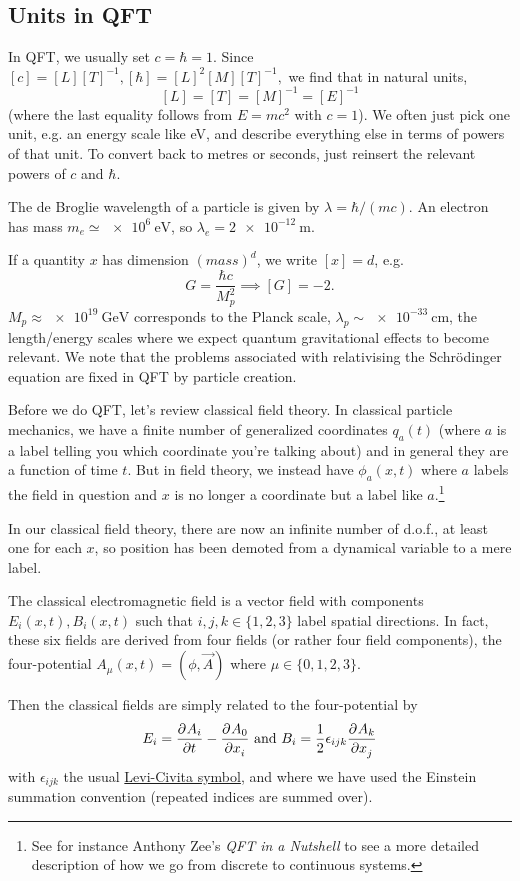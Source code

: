 \subsection*{Units in QFT} In QFT, we usually set $c=\hbar=1$. Since $[c]=[L][T]^{-1}, [\hbar]=[L]^2[M][T]^{-1},$ we find that in natural units, $$[L]=[T]=[M]^{-1}=[E]^{-1}$$ (where the last equality follows from $E=mc^2$ with $c=1$). We often just pick one unit, e.g. an energy scale like eV, and describe everything else in terms of powers of that unit. To convert back to metres or seconds, just reinsert the relevant powers of $c$ and $\hbar$.

\begin{exm}
The de Broglie wavelength of a particle is given by $\lambda=\hbar/(mc)$. An electron has mass $m_e\simeq \SI{e6}{\electronvolt}$, so $\lambda_e = \SI{2e-12}{\meter}$.
\end{exm}

If a quantity $x$ has dimension $(mass)^d$, we write $[x]=d$, e.g. $$G=\frac{\hbar c}{M_p^2}\implies [G]=-2.$$  $M_p \approx \SI{e19}{\giga\electronvolt}$ corresponds to the Planck scale, $\lambda_p \sim \SI{e-33}{\centi\meter}$, the length/energy scales where we expect quantum gravitational effects to become relevant. We note that the problems associated with relativising the Schr\"odinger equation are fixed in QFT by particle creation.

Before we do QFT, let's review classical field theory. In classical particle mechanics, we have a finite number of generalized coordinates $q_a(t)$ (where $a$ is a label telling you which coordinate you're talking about) and in general they are a function of time $t$. But in field theory, we instead have $\phi_a(x,t)$ where $a$ labels the field in question and $x$ is no longer a coordinate but a label like $a$.\footnote{See for instance Anthony Zee's \textit{QFT in a Nutshell} to see a more detailed description of how we go from discrete to continuous systems.}

In our classical field theory, there are now an infinite number of d.o.f., at least one for each $x$, so position has been demoted from a dynamical variable to a mere label.

\begin{exm}
The classical electromagnetic field is a vector field with components $E_i(x,t), B_i(x,t)$ such that $i,j,k\in \{1,2,3\}$ label spatial directions. In fact, these six fields are derived from four fields (or rather four field components), the four-potential $A_\mu(x,t)=(\phi,\vec{A})$ where $\mu\in\{0,1,2,3\}$.

Then the classical fields are simply related to the four-potential by
$$E_i=\P{A_i}{t}-\P{A_0}{x_i} \text{ and } B_i=\frac{1}{2}\epsilon_{ijk} \P{A_k}{x_j}$$
with $\epsilon_{ijk}$ the usual \href{https://en.wikipedia.org/wiki/Levi-Civita_symbol}{Levi-Civita symbol}, and where we have used the Einstein summation convention (repeated indices are summed over).
\end{exm}

